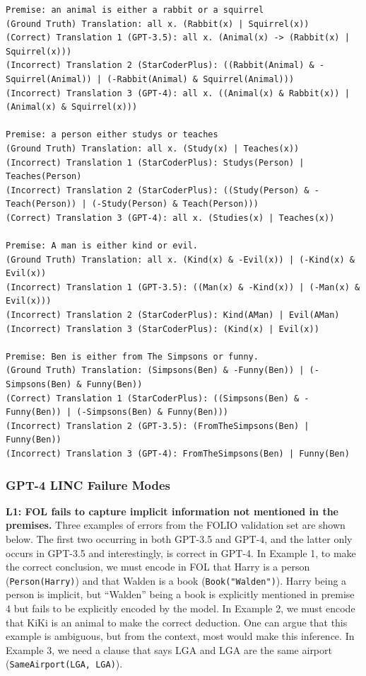 \begin{lstlisting}[breaklines=true]
Premise: an animal is either a rabbit or a squirrel
(Ground Truth) Translation: all x. (Rabbit(x) | Squirrel(x))
(Correct) Translation 1 (GPT-3.5): all x. (Animal(x) -> (Rabbit(x) | Squirrel(x)))
(Incorrect) Translation 2 (StarCoderPlus): ((Rabbit(Animal) & -Squirrel(Animal)) | (-Rabbit(Animal) & Squirrel(Animal)))
(Incorrect) Translation 3 (GPT-4): all x. ((Animal(x) & Rabbit(x)) | (Animal(x) & Squirrel(x)))

Premise: a person either studys or teaches
(Ground Truth) Translation: all x. (Study(x) | Teaches(x))
(Incorrect) Translation 1 (StarCoderPlus): Studys(Person) | Teaches(Person)
(Incorrect) Translation 2 (StarCoderPlus): ((Study(Person) & -Teach(Person)) | (-Study(Person) & Teach(Person)))
(Correct) Translation 3 (GPT-4): all x. (Studies(x) | Teaches(x))

Premise: A man is either kind or evil.
(Ground Truth) Translation: all x. (Kind(x) & -Evil(x)) | (-Kind(x) & Evil(x))
(Incorrect) Translation 1 (GPT-3.5): ((Man(x) & -Kind(x)) | (-Man(x) & Evil(x)))
(Incorrect) Translation 2 (StarCoderPlus): Kind(AMan) | Evil(AMan)
(Incorrect) Translation 3 (StarCoderPlus): (Kind(x) | Evil(x))

Premise: Ben is either from The Simpsons or funny.
(Ground Truth) Translation: (Simpsons(Ben) & -Funny(Ben)) | (-Simpsons(Ben) & Funny(Ben))
(Correct) Translation 1 (StarCoderPlus): ((Simpsons(Ben) & -Funny(Ben)) | (-Simpsons(Ben) & Funny(Ben)))
(Incorrect) Translation 2 (GPT-3.5): (FromTheSimpsons(Ben) | Funny(Ben))
(Incorrect) Translation 3 (GPT-4): FromTheSimpsons(Ben) | Funny(Ben)
\end{lstlisting}

\subsubsection{GPT-4 LINC Failure Modes}
\textbf{L1: FOL fails to capture implicit information not mentioned in the premises.}
Three examples of errors from the FOLIO validation set are shown below. The first two occurring in both GPT-3.5 and GPT-4, and the latter only occurs in GPT-3.5 and interestingly, is correct in GPT-4. In Example 1, to make the correct conclusion, we must encode in FOL that Harry is a person (\texttt{Person(Harry)}) and that Walden is a book (\texttt{Book("Walden")}). Harry being a person is implicit, but ``Walden'' being a book is explicitly mentioned in premise 4 but fails to be explicitly encoded by the model. In Example 2, we must encode that KiKi is an animal to make the correct deduction. One can argue that this example is ambiguous, but from the context, most would make this inference. In Example 3, we need a clause that says LGA and LGA are the same airport (\texttt{SameAirport(LGA, LGA)}).


